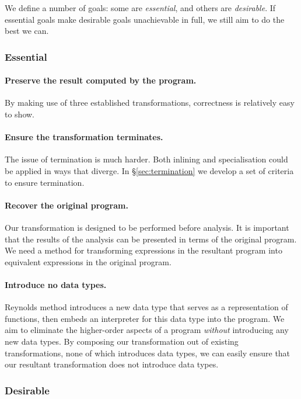 We define a number of goals: some are \textit{essential}, and others are \textit{desirable}. If essential goals make desirable goals unachievable in full, we still aim to do the best we can.

\subsubsection*{Essential}

\paragraph{Preserve the result computed by the program.} By making use of three established transformations, correctness is relatively easy to show.

\paragraph{Ensure the transformation terminates.} The issue of termination is much harder. Both inlining and specialisation could be applied in ways that diverge. In \S\ref{sec:termination} we develop a set of criteria to ensure termination.

\paragraph{Recover the original program.} Our transformation is designed to be performed before analysis. It is important that the results of the analysis can be presented in terms of the original program. We need a method for transforming expressions in the resultant program into equivalent expressions in the original program.

\paragraph{Introduce no data types.} Reynolds method introduces a new data type that serves as a representation of functions, then embeds an interpreter for this data type into the program. We aim to eliminate the higher-order aspects of a program \textit{without} introducing any new data types. By composing our transformation out of existing transformations, none of which introduces data types, we can easily ensure that our resultant transformation does not introduce data types.


\subsubsection*{Desirable}


